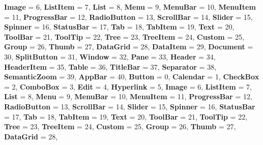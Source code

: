 \begin{DoxyCompactItemize}
\newline
{\bfseries Image} = 6, 
{\bfseries List\+Item} = 7, 
{\bfseries List} = 8, 
{\bfseries Menu} = 9, 
\newline
{\bfseries Menu\+Bar} = 10, 
{\bfseries Menu\+Item} = 11, 
{\bfseries Progress\+Bar} = 12, 
{\bfseries Radio\+Button} = 13, 
\newline
{\bfseries Scroll\+Bar} = 14, 
{\bfseries Slider} = 15, 
{\bfseries Spinner} = 16, 
{\bfseries Status\+Bar} = 17, 
\newline
{\bfseries Tab} = 18, 
{\bfseries Tab\+Item} = 19, 
{\bfseries Text} = 20, 
{\bfseries Tool\+Bar} = 21, 
\newline
{\bfseries Tool\+Tip} = 22, 
{\bfseries Tree} = 23, 
{\bfseries Tree\+Item} = 24, 
{\bfseries Custom} = 25, 
\newline
{\bfseries Group} = 26, 
{\bfseries Thumb} = 27, 
{\bfseries Data\+Grid} = 28, 
{\bfseries Data\+Item} = 29, 
\newline
{\bfseries Document} = 30, 
{\bfseries Split\+Button} = 31, 
{\bfseries Window} = 32, 
{\bfseries Pane} = 33, 
\newline
{\bfseries Header} = 34, 
{\bfseries Header\+Item} = 35, 
{\bfseries Table} = 36, 
{\bfseries Title\+Bar} = 37, 
\newline
{\bfseries Separator} = 38, 
{\bfseries Semantic\+Zoom} = 39, 
{\bfseries App\+Bar} = 40, 
{\bfseries Button} = 0, 
\newline
{\bfseries Calendar} = 1, 
{\bfseries Check\+Box} = 2, 
{\bfseries Combo\+Box} = 3, 
{\bfseries Edit} = 4, 
\newline
{\bfseries Hyperlink} = 5, 
{\bfseries Image} = 6, 
{\bfseries List\+Item} = 7, 
{\bfseries List} = 8, 
\newline
{\bfseries Menu} = 9, 
{\bfseries Menu\+Bar} = 10, 
{\bfseries Menu\+Item} = 11, 
{\bfseries Progress\+Bar} = 12, 
\newline
{\bfseries Radio\+Button} = 13, 
{\bfseries Scroll\+Bar} = 14, 
{\bfseries Slider} = 15, 
{\bfseries Spinner} = 16, 
\newline
{\bfseries Status\+Bar} = 17, 
{\bfseries Tab} = 18, 
{\bfseries Tab\+Item} = 19, 
{\bfseries Text} = 20, 
\newline
{\bfseries Tool\+Bar} = 21, 
{\bfseries Tool\+Tip} = 22, 
{\bfseries Tree} = 23, 
{\bfseries Tree\+Item} = 24, 
\newline
{\bfseries Custom} = 25, 
{\bfseries Group} = 26, 
{\bfseries Thumb} = 27, 
{\bfseries Data\+Grid} = 28, 
\newline

\end{DoxyCompactItemize}
